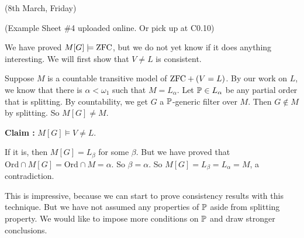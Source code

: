 \documentclass[12pt,a4paper]{article}
\newenvironment{proof}
{\begin{changemargin}{0.5cm}{0.5cm} 
	}%
	{\end{changemargin}
}
\newenvironment{p}
{\begin{proof} 
	}%
	{\end{proof}
}
\begin{document}
(8th March, Friday)
\s

(Example Sheet \#4 uploaded online. Or pick up at C0.10)
\s

We have proved $M[G] \models \text{ZFC}$, but we do not yet know if it does anything interesting. We will first show that $V\neq L$ is consistent.
\s

Suppose $M$ is a countable transitive model of $\text{ZFC} +(V=L)$. By our work on $L$, we know that there is $\alpha < \omega_1$ such that $M= L_{\alpha}$. Let $\mathbb{P} \in L_{\alpha}$ be any partial order that is splitting. By countability, we get $G$ a $\mathbb{P}$-generic filter over $M$. Then $G\not\in M$ by splitting. So $M[G] \neq M$. 
\s

\textbf{Claim :} $M[G] \models V\neq L$.
\begin{p}
\pf If it is, then $M[G] = L_{\beta}$ for some $\beta$. But we have proved that $\text{Ord} \cap M[G] = \text{Ord} \cap M =\alpha$. So $\beta = \alpha$. So $M[G] = L_{\beta} = L_{\alpha} =M$, a contradiction.

\eop
\end{p}
\s

This is impressive, because we can start to prove consistency results with this technique. But we have not assumed any properties of $\mathbb{P}$ aside from splitting property. We would like to impose more conditions on $\mathbb{P}$ and draw stronger conclusions.
\end{document}
